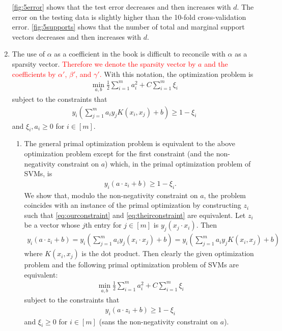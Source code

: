 \begin{enumerate}
    \autoref{fig:5error} shows that the test error decreases and then
    increases with $d$.
    The error on the testing data is slightly higher than the 10-fold
    cross-validation error.
    \autoref{fig:5supports} shows that the number of total and marginal
    support vectors decreases and then increases with $d$.
 
    \item 
    The use of $\alpha$ as a coefficient in the book
    is difficult to reconcile with $\alpha$ as a sparsity vector.
    \textcolor{red}{
    Therefore we denote the sparsity vector by $a$
    and the coefficients by $\alpha'$, $\beta'$, and $\gamma'$.}
    With this notation, the optimization problem is
    \begin{align}\label{eq:primal}
        \min_{a,b} \frac{1}{2}\sum_{i=1}^m a_i^2
        + C\sum_{i=1}^m \xi_i
    \end{align}
    subject to the constraints that
    \begin{align}\label{eq:ourconstraint}
        y_i\left(
        \sum_{j=1}^m a_i y_j K(x_i,x_j)
        +b \right) \geq 1 - \xi_i
    \end{align}
    and $\xi_i,a_i\geq 0$ for $i \in [m]$.
    \begin{enumerate}
        \item The general primal optimization problem is
        equivalent to the above optimization problem except for
        the first constraint (and the non-negativity constraint
        on $a$) which, in the primal optimization problem of SVMs, is
        \begin{align}\label{eq:theirconstraint}
            y_i(a\cdot z_i + b) \geq 1 - \xi_i.
        \end{align}
        We show that, modulo the non-negativity constraint on $a$,
        the problem coincides with an instance of
        the primal optimization by constructing $z_i$
        such that \autoref{eq:ourconstraint} and
        \autoref{eq:theirconstraint} are equivalent.
        Let $z_i$ be a vector whose $j$th entry for
        $j\in[m]$ is $y_j(x_j\cdot x_i)$.
        Then
        \begin{align}
            y_i(a \cdot z_i + b) =
            y_i\left(
            \sum_{j=1}^m a_i y_j (x_i \cdot x_j)
            +b \right) = 
            y_i\left(
            \sum_{j=1}^m a_i y_j K(x_i,x_j)
            +b \right)
            \nonumber
        \end{align}
        where $K(x_i,x_j)$ is the dot product.
        Then clearly the given optimization problem and
        the following primal optimization problem of SVMs
        are equivalent:
        \begin{align}
            \min_{a,b} \frac{1}{2}\sum_{i=1}^m a_i^2
            + C\sum_{i=1}^m \xi_i
            \nonumber
        \end{align}
        subject to the constraints that
        \begin{align}
            y_i(a\cdot z_i + b)\geq 1 - \xi_i
            \nonumber
        \end{align}
        and $\xi_i\geq 0$ for $i \in [m]$
        (sans the non-negativity constraint on $a$).


\end{enumerate}
\end{enumerate}
